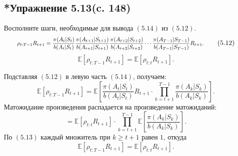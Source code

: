\subsection{*Упражнение 5.13(c. 148)}
Восполните шаги, необходимые для вывода $(5.14)$ из $(5.12)$.
\begin{equation}
    \resizebox{0.8\textwidth}{!}{$\displaystyle \rho_{t:T-1} R_{t+1} = \frac{\pi(A_t|S_t)}{b(A_t|S_t)} \frac{\pi(A_{t+1}|S_{t+1})}{b(A_{t+1}|S_{t+1})} \frac{\pi(A_{t+2}|S_{t+2})}{b(A_{t+2}|S_{t+2})} \cdots \frac{\pi(A_{T-1}|S_{T-1})}{b(A_{T-1}|S_{T-1})} R_{t+1}. $}
    \tag{5.12}
\end{equation}
\begin{equation}
    \mathbb{E}[\rho_{t:T-1} R_{t+1}] = \mathbb{E}[\rho_{t:t} R_{t+1}].
    \tag{5.14}
\end{equation}
\begin{solution}
    Подставляя $(5.12)$ в левую часть $(5.14)$, получаем:
    \[
    \mathbb{E}[\rho_{t:T-1} R_{t+1}] = \mathbb{E}\left[\frac{\pi(A_t|S_t)}{b(A_t|S_t)} R_{t+1} \cdot \prod_{k=t+1}^{T-1} \frac{\pi(A_k|S_k)}{b(A_k|S_k)}\right].
    \]
    Матожидание произведения распадается на произведение матожиданий:
    \[
    = \mathbb{E}[\rho_{t:t} R_{t+1}] \cdot \prod_{k=t+1}^{T-1} \mathbb{E}\left[\frac{\pi(A_k|S_k)}{b(A_k|S_k)}\right].
    \]
    По $(5.13)$ каждый множитель при $k \geq t+1$ равен $1$, откуда
    \[
    \mathbb{E}[\rho_{t:T-1} R_{t+1}] = \mathbb{E}[\rho_{t:t} R_{t+1}]. 
    \]
\end{solution}

